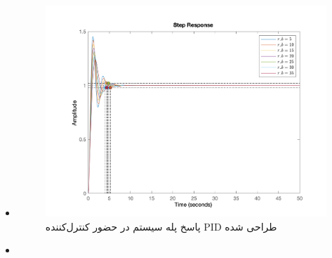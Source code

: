 \begin{itemize}
\begin{figure}[H]
	\end{figure}
	\item {}
	\begin{figure}[H]
		\centering
		\includegraphics[width=12cm]{../Figure/P_III/mzn.png}
		\caption{پاسخ پله سیستم در حضور کنترل‌کننده PID طراحی شده }
	\end{figure}
	\item {}
	

\end{itemize}
